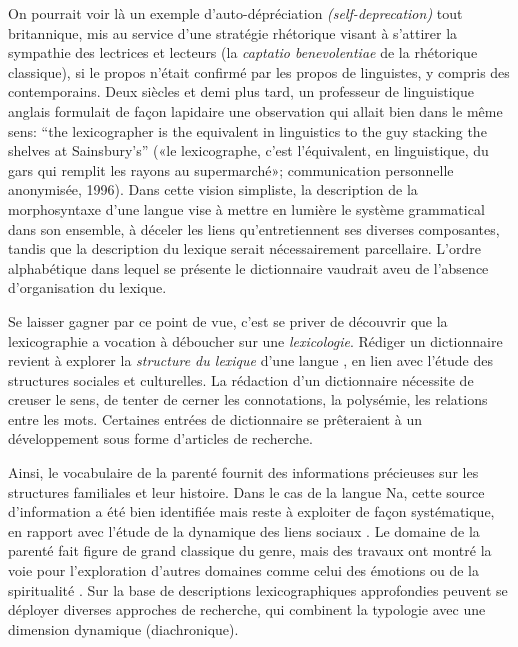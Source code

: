 On pourrait voir là un exemple d'auto-dépréciation \emph{(self-deprecation)} tout britannique, mis au service d'une stratégie rhétorique visant à s'attirer la sympathie des lectrices et lecteurs (la \emph{captatio benevolentiae} de la rhétorique classique), si le propos n'était confirmé par les propos de linguistes, y compris des contemporains. Deux siècles et demi plus tard, un professeur de linguistique anglais formulait de façon lapidaire une observation qui allait bien dans le même sens: “the lexicographer is the equivalent in linguistics to the guy stacking the shelves at Sainsbury’s” («le lexicographe, c'est l'équivalent, en linguistique, du gars qui remplit les rayons au supermarché»; communication personnelle anonymisée, 1996). %
Dans cette vision simpliste, la description de la morphosyntaxe d’une langue vise à mettre en lumière le système grammatical dans son ensemble, à déceler les liens qu’entretiennent ses diverses composantes, tandis que la description du lexique serait nécessairement parcellaire. L’ordre alphabétique dans lequel se présente le dictionnaire vaudrait aveu de l’absence d’organisation du lexique.

Se laisser gagner par ce point de vue, c'est se priver de découvrir que la lexicographie a vocation à déboucher sur une \emph{lexicologie}. Rédiger un dictionnaire revient à explorer la \emph{structure du lexique} d'une langue \parencite{francois2008semantic}, en lien avec l'étude des structures sociales et culturelles. La rédaction d'un dictionnaire nécessite de creuser le sens, de tenter de cerner les connotations, la polysémie, les relations entre les mots. Certaines entrées de dictionnaire se prêteraient à un développement sous forme d'articles de recherche.

Ainsi, le vocabulaire de la parenté fournit des informations précieuses sur les structures familiales et leur histoire. Dans le cas de la langue Na, cette source d’information a été bien identifiée \parencite{fu1983} mais reste à exploiter de façon systématique, en rapport avec l'étude de la dynamique des liens sociaux \parencite{milan2021entraide}. Le domaine de la parenté fait figure de grand classique du genre, mais des travaux ont montré la voie pour l’exploration d’autres domaines comme celui des émotions \parencite{tersis_langage_2017} ou de la spiritualité \parencite{francois_shadows_2013}. Sur la base de descriptions lexicographiques approfondies peuvent se déployer diverses approches de recherche, qui combinent la typologie avec une dimension dynamique (diachronique).

